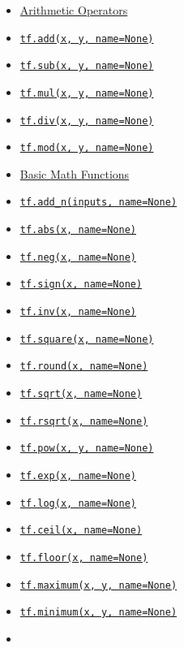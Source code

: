 \begin{itemize}
\tightlist
\item
  \protect\hyperlink{AUTOGENERATED-arithmetic-operators}{Arithmetic
  Operators}
\item
  \protect\hyperlink{add}{\texttt{tf.add(x,\ y,\ name=None)}}
\item
  \protect\hyperlink{sub}{\texttt{tf.sub(x,\ y,\ name=None)}}
\item
  \protect\hyperlink{mul}{\texttt{tf.mul(x,\ y,\ name=None)}}
\item
  \protect\hyperlink{div}{\texttt{tf.div(x,\ y,\ name=None)}}
\item
  \protect\hyperlink{mod}{\texttt{tf.mod(x,\ y,\ name=None)}}
\item
  \protect\hyperlink{AUTOGENERATED-basic-math-functions}{Basic Math
  Functions}
\item
  \protect\hyperlink{addux5fn}{\texttt{tf.add\_n(inputs,\ name=None)}}
\item
  \protect\hyperlink{abs}{\texttt{tf.abs(x,\ name=None)}}
\item
  \protect\hyperlink{neg}{\texttt{tf.neg(x,\ name=None)}}
\item
  \protect\hyperlink{sign}{\texttt{tf.sign(x,\ name=None)}}
\item
  \protect\hyperlink{inv}{\texttt{tf.inv(x,\ name=None)}}
\item
  \protect\hyperlink{square}{\texttt{tf.square(x,\ name=None)}}
\item
  \protect\hyperlink{round}{\texttt{tf.round(x,\ name=None)}}
\item
  \protect\hyperlink{sqrt}{\texttt{tf.sqrt(x,\ name=None)}}
\item
  \protect\hyperlink{rsqrt}{\texttt{tf.rsqrt(x,\ name=None)}}
\item
  \protect\hyperlink{pow}{\texttt{tf.pow(x,\ y,\ name=None)}}
\item
  \protect\hyperlink{exp}{\texttt{tf.exp(x,\ name=None)}}
\item
  \protect\hyperlink{log}{\texttt{tf.log(x,\ name=None)}}
\item
  \protect\hyperlink{ceil}{\texttt{tf.ceil(x,\ name=None)}}
\item
  \protect\hyperlink{floor}{\texttt{tf.floor(x,\ name=None)}}
\item
  \protect\hyperlink{maximum}{\texttt{tf.maximum(x,\ y,\ name=None)}}
\item
  \protect\hyperlink{minimum}{\texttt{tf.minimum(x,\ y,\ name=None)}}
\item

\end{itemize}
